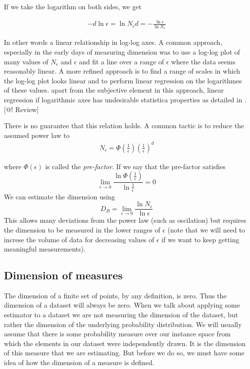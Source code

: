 \documentclass[11pt]{article}
\begin{document}
If we take the logarithm on both sides, we get

\begin{align*}
 - d \ln \epsilon = \ln N_\epsilon
 d = - \frac{\ln \epsilon}{\ln N_\epsilon}
\end{align*}

In other words a linear relationship in log-log axes. A common approach, especially in the early days of measuring dimension was to use a log-log plot of many values of $N_\epsilon$ and $\epsilon$ and fit a line over a range of $\epsilon$ where the data seems reasonably linear. A more refined approach is to find a range of scales in which the log-log plot looks linear and to perform linear regression on the logarithmes of these values. apart from the subjective element in this approach, linear regression if logarithmic axes has undesirable statistica properties as detailed in \cite{clauset}. [@! Review]

There is no guarantee that this relation holds. A common tactic is to reduce the assumed power law to  
\begin{align}
N_\epsilon = \Phi\left(\frac{1}{\epsilon}\right)\left (\frac{1}{\epsilon}\right) ^ d
\end{align}

where $\Phi\left(\epsilon\right)$ is called the \textit{pre-factor}. If we say that the pre-factor satisfies
\[
\lim_{\epsilon \rightarrow 0} \frac{\ln \Phi(\frac{1}{\epsilon})}{\ln \frac{1}{\epsilon}} = 0
\]
We can estimate the dimension using 
\[
D_B = \lim_{\epsilon \rightarrow 0} \frac{\ln N_\epsilon}{ \ln \epsilon}
\]
This allows many deviations from the power law (such as oscilation) but requires the dimension to be measured in the lower ranges of $\epsilon$ (note that we will need to increse the volume of data for decreasing values of $\epsilon$ if we want to keep getting meaningful measurements).

\subsection{Dimension of measures}

The dimension of a finite set of points, by any definition, is zero. Thus the dimension of a dataset will always be zero. When we talk about applying some estimator to a dataset we are not measuring the dimension of the dataset, but rather the dimension of the underlying probability distribution. We will usually assume that there is some probability measure over our instance space from which the elements in our dataset were independently drawn. It is the dimension of this measure that we are estimating. But before we do so, we must have some idea of how the dimension of a measure is defined.
\end{document}
